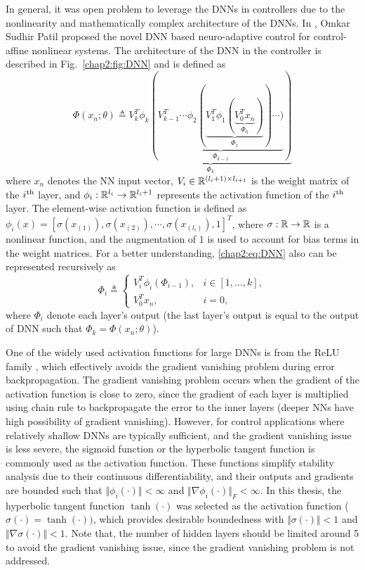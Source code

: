 In general, it was open problem to leverage the DNNs in controllers due to the nonlinearity and mathematically complex architecture of the DNNs.
In \cite{RN13}, Omkar Sudhir Patil \etal proposed the novel DNN based neuro-adaptive control for control-affine nonlinear systems.
The architecture of the DNN in the controller is described in Fig.~\ref{chap2:fig:DNN} and is defined as 
\begin{equation}
  \Phi(x_n;\theta) \triangleq 
  \underbrace{
    V_k^T  \phi_{k}(
    \underbrace{
      V_{k-1}^T   \cdots \phi_2(
      \underbrace
        {
        V_1^T   \phi_1(
        \underbrace
          {
          V_0^T   x_n
        }_{\Phi_0}
        )
      }_{\Phi_1}
      )\cdots )
    }_{\Phi_{k-1}}
    )
  }_{\Phi_k}
  \label{chap2:eq:DNN}
\end{equation}
where $x_n$ denotes the NN input vector, $V_i\in\mathbb{R}^{(l_i+1)\times l_{i+1}}$ is the weight matrix of the $i\textsuperscript{th}$ layer, and $\phi_i: \mathbb{R}^{l_i}\to\mathbb{R}^{l_i+1}$ represents the activation function of the $i\textsuperscript{th}$ layer. 
The element-wise activation function is defined as $\phi_i(x)=[\sigma(x_{(1)}),\sigma(x_{(2)}),\cdots, \sigma(x_{(l_{i})}), 1]^T$, where $\sigma: \mathbb{R}\to\mathbb{R}$ is a nonlinear function, and the augmentation of $1$ is used to account for bias terms in the weight matrices.  
For a better understanding, \eqref{chap2:eq:DNN} also can be represented recursively as 
\begin{equation}
    \Phi_i \triangleq
    \begin{cases}
        V_i^T  \phi_i(\Phi_{i-1}), &i\in[1,\dots,k],\\
        V_0^T  x_n,&i=0,
    \end{cases}
\end{equation}
where $\Phi_i$ denote each layer's output (\ie the last layer's output is equal to the output of DNN such that $\Phi_k = \Phi(x_n;\theta)$).

One of the widely used activation functions for large DNNs is from the ReLU family \cite{RN15}, which effectively avoids the gradient vanishing problem during error backpropagation. 
The gradient vanishing problem occurs when the gradient of the activation function is close to zero, since the gradient of each layer is multiplied using chain rule to backpropagate the error to the inner layers (\ie deeper NNs have high possibility of gradient vanishing).
However, for control applications where relatively shallow DNNs are typically sufficient, and the gradient vanishing issue is less severe, the sigmoid function or the hyperbolic tangent function is commonly used as the activation function. 
These functions simplify stability analysis due to their continuous differentiability, and their outputs and gradients are bounded such that $\Vert \phi_i(\cdot)\Vert < \infty$ and $\Vert \nabla\phi_i(\cdot)\Vert_F < \infty$. 
In this thesis, the hyperbolic tangent function $\tanh(\cdot)$ was selected as the activation function (\ie $\sigma(\cdot) = \tanh(\cdot))$, which provides desirable boundedness with $\Vert\sigma(\cdot)\Vert<1$ and $\Vert\nabla\sigma(\cdot)\Vert< 1$.
Note that, the number of hidden layers should be limited around 5 to avoid the gradient vanishing issue, since the gradient vanishing problem is not addressed.


